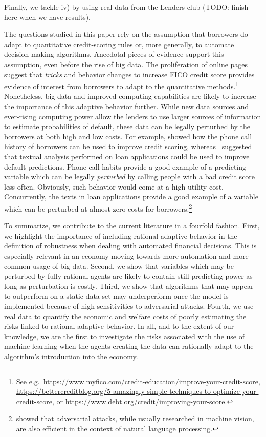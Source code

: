 \documentclass[12pt]{article} %
\begin{document}
Finally, we tackle iv) by using real data from the Lenders club (TODO: finish here when we have results). 

The questions studied in this paper rely on the assumption that borrowers do adapt to quantitative credit-scoring rules or, more generally, to automate decision-making algorithms. 
Anecdotal pieces of evidence support this assumption, even before the rise of big data. The proliferation of online pages suggest that \textit{tricks} and behavior changes to increase FICO credit score provides evidence of interest from borrowers to adapt to the quantitative methods.\footnote{
See e.g.~\url{https://www.myfico.com/credit-education/improve-your-credit-score}, \url{https://bettercreditblog.org/5-amazingly-simple-techniques-to-optimize-your-credit-score}, or \url{https://www.debt.org/credit/improving-your-score}.}
Nonetheless, big data and improved computing capabilities are likely to increase the importance of this adaptive behavior further. While new data sources and ever-rising computing power allow the lenders to use larger sources of information to estimate probabilities of default, these data can be legally perturbed by the borrowers at both high and low costs. For example, \cite{oskarsdottir2019value} showed how the phone call history of borrowers can be used to improve credit scoring, whereas~\cite{netzer2019words} suggested that textual analysis performed on loan applications could be used to improve default predictions. 
Phone call habits provide a good example of a predicting variable which can be legally \textit{perturbed} by calling people with a bad credit score less often. Obviously, such behavior would come at a high utility cost.
Concurrently, the texts in loan applications provide a good example of a variable which can be perturbed at almost zero costs for borrowers.\footnote{\cite{liang2017deep} showed that adversarial attacks, while usually researched in machine vision, are also efficient in the context of natural language processing.}


To summarize, we contribute to the current literature in a fourfold fashion. First, we highlight the importance of including rational adaptive behavior in the definition of robustness when dealing with automated financial decisions. This is especially relevant in an economy moving towards more automation and more common usage of big data. Second, we show that variables which may be perturbed by fully rational agents are likely to contain still predicting power as long as perturbation is costly. Third, we show that algorithms that may appear to outperform on a static data set may underperform once the model is implemented because of high sensitivities to adversarial attacks. Fourth, we use real data to quantify the economic and welfare costs of poorly estimating the risks linked to rational adaptive behavior. In all, and to the extent of our knowledge, we are the first to investigate the risks associated with the use of machine learning when the agents creating the data can rationally adapt to the algorithm's introduction into the economy. 
\end{document}
